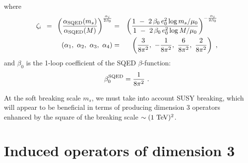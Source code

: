 \documentclass[a4paper,12pt]{article}
\begin{document}
        where
\begin{eqnarray*}
        \zeta_i ~\, = ~\, 
	\left (
	  \frac{\alpha_{\rm SQED}(m_s)}
               {\alpha_{\rm SQED}(M)}
	\right )^
		{\frac{\alpha_i}
		      {2\beta_0}}
	& = &
	\left (
	   \frac{ 1 ~-~ 2\,\beta_0\, e_0^2 \log m_s/\mu_0 }
                { 1 ~-~ 2\,\beta_0\, e_0^2 \log M/\mu_0 }
        \right )^
             {- \frac{\alpha_i}{2\beta_0} } \\
	(\alpha_1,~ \alpha_2,~ \alpha_3,~ \alpha_4) & = &
	\left(  \frac{3}{8\pi^2},~ 
	      - \frac{1}{8\pi^2},~ 
	        \frac{6}{8\pi^2},~ 
		\frac{2}{8\pi^2} 
	\right)~,
\end{eqnarray*}
        and $ \beta_0 $ is the 1-loop coefficient of the
	SQED $ \beta $-function:
\[
        \beta_0^{\rm SQED} = \frac{1}{8\pi^2}~.
\]

	At the soft breaking scale $ m_s $, we must take into
	account SUSY breaking, which will appear to be 
	beneficial in terms of producing dimension 3 operators
	enhanced by the square of the breaking scale 
	$ \sim (1\ {\rm TeV})^2 $.

\section{Induced operators of dimension 3}
\label{InducedDim3}
\end{document}
